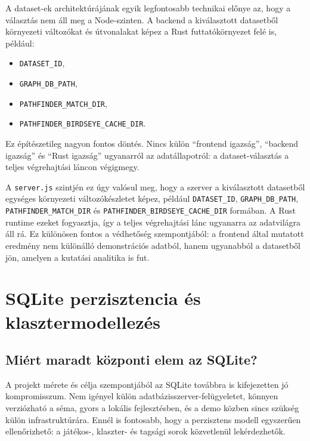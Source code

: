 ﻿\documentclass[a4paper,12pt]{report}
\begin{document}
A dataset-ek architektúrájának egyik legfontosabb technikai előnye az, hogy a választás nem áll meg a Node-szinten. A backend a kiválasztott datasetből környezeti változókat és útvonalakat képez a Rust futtatókörnyezet felé is, például:

\begin{itemize}
    \item \texttt{DATASET\_ID},
    \item \texttt{GRAPH\_DB\_PATH},
    \item \texttt{PATHFINDER\_MATCH\_DIR},
    \item \texttt{PATHFINDER\_BIRDSEYE\_CACHE\_DIR}.
\end{itemize}

Ez építészetileg nagyon fontos döntés. Nincs külön ``frontend igazság'', ``backend igazság'' és ``Rust igazság'' ugyanarról az adatállapotról: a dataset-választás a teljes végrehajtási láncon végigmegy.

A \texttt{server.js} szintjén ez úgy valósul meg, hogy a szerver a kiválasztott datasetből egységes környezeti változókészletet képez, például \texttt{DATASET\_ID}, \texttt{GRAPH\_DB\_PATH}, \texttt{PATHFINDER\_MATCH\_DIR} és \texttt{PATHFINDER\_BIRDSEYE\_CACHE\_DIR} formában. A Rust runtime ezeket fogyasztja, így a teljes végrehajtási lánc ugyanarra az adatvilágra áll rá. Ez különösen fontos a védhetőség szempontjából: a frontend által mutatott eredmény nem különálló demonstrációs adatból, hanem ugyanabból a datasetből jön, amelyen a kutatási analitika is fut.

\chapter{SQLite perzisztencia és klasztermodellezés}

\section{Miért maradt központi elem az SQLite?}

A projekt mérete és célja szempontjából az SQLite továbbra is kifejezetten jó kompromisszum. Nem igényel külön adatbázisszerver-felügyeletet, könnyen verziózható a séma, gyors a lokális fejlesztésben, és a demo közben sincs szükség külön infrastruktúrára. Ennél is fontosabb, hogy a perzisztens modell egyszerűen ellenőrizhető: a játékos-, klaszter- és tagsági sorok közvetlenül lekérdezhetők.
\end{document}
